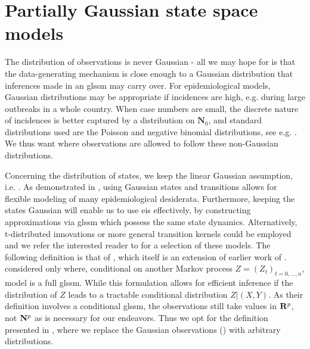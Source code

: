 \section{Partially Gaussian state space models}
\label{sec:logconcave_gaussian_state_space_models}

The distribution of observations is never Gaussian - all we may hope for is that the data-generating mechanism is close enough to a Gaussian distribution that inferences made in an \acrshort{glssm} may carry over.
For epidemiological models, Gaussian distributions may be appropriate if incidences are high, e.g. during large outbreaks in a whole country. 
When case numbers are small, the discrete nature of incidences is better captured by a distribution on $\mathbf N_{0}$, and standard distributions used are the Poisson and negative binomial distributions, see e.g. \citep{Lloyd-Smith2005Superspreadinga}.
We thus want  where observations are allowed to follow these non-Gaussian distributions. 

Concerning the distribution of states, we keep the linear Gaussian assumption, i.e. . As demonstrated in , using Gaussian states and transitions allows for flexible modeling of many epidemiological desiderata. Furthermore, keeping the states Gaussian will enable us to use \acrfull{eis} effectively, by constructing approximations via \acrshort{glssm} which possess the same state dynamics. Alternatively, t-distributed innovations or more general transition kernels could be employed and we refer the interested reader to \citep[Part II]{Durbin2012Time} for a selection of these models. The following definition is that of \citep{Koopman2019Modified}, which itself is an extension of earlier work of \citep{Shephard1994Partial}. \citep{Shephard1994Partial} considered only  where, conditional on another Markov process $Z = (Z_{t})_{t = 0, \dots, n}$, model is a full \acrshort{glssm}. While this formulation allows for efficient inference if the distribution of $Z$ leads to a tractable conditional distribution $Z| (X, Y)$. As their definition involves a conditional \acrshort{glssm}, the observations still take values in $\mathbf R^{p}$, not $\mathbf N^{p}$ as is necessary for our endeavors. Thus we opt for the definition presented in \citep{Koopman2019Modified}, where we replace the Gaussian observations () with arbitrary distributions.

